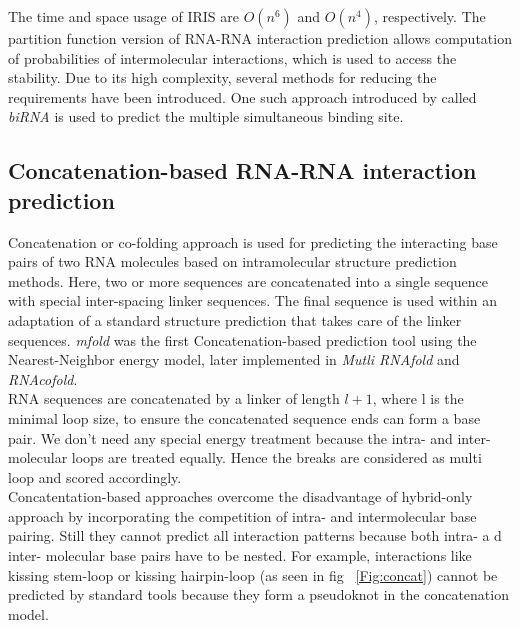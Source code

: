 \documentclass[twoside,a4paper]{report}
\numberwithin{equation}{section}
\begin{document}
	The time and space usage of IRIS are $ O(n^6)$ and $ O(n^4)$, respectively. The partition function version of RNA-RNA interaction prediction allows computation of probabilities of intermolecular interactions, which is used to access the stability. Due to its high complexity, several methods for reducing the requirements have been introduced. One such approach introduced by \citet{ chitsaz2009birna} called \textit{biRNA} is used to predict the multiple simultaneous binding site. \\
	
	 
	\subsection{Concatenation-based RNA-RNA interaction prediction}
	Concatenation or co-folding approach is used for predicting the interacting base pairs of two RNA molecules based on intramolecular structure prediction methods. Here, two or more sequences are concatenated  into a single sequence with special inter-spacing linker sequences. The final sequence is used within an adaptation of a standard structure prediction that takes  care of the linker sequences. \textit{mfold} was the first Concatenation-based prediction tool using the Nearest-Neighbor energy model, later implemented in \textit{Mutli RNAfold} and \textit{RNAcofold}.\\

	
	 RNA sequences are concatenated by a linker of length $l+1$, where l is the minimal loop size, to ensure the concatenated sequence ends can form a base pair. We don't need any special energy treatment because the intra- and inter- molecular loops are treated equally. Hence the breaks are considered as multi loop and scored accordingly. \\
		
	Concatentation-based approaches overcome the disadvantage of hybrid-only approach by incorporating the competition of intra- and intermolecular base pairing. Still they cannot predict all interaction patterns because both intra- a d inter- molecular base pairs have to be nested. For example, interactions like kissing stem-loop or kissing hairpin-loop (as seen in fig ~\ref{Fig:concat}) cannot be predicted by standard tools because they form a pseudoknot in the concatenation model. \\
	
\end{document}
